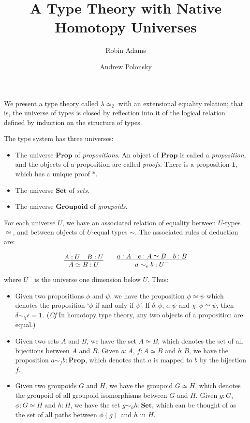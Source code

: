 \documentclass{easychair}
\title{A Type Theory with Native Homotopy Universes}
\author{Robin Adams\inst{1} \and Andrew Polonsky\inst{2}}
\institute{Universitetet i Bergen \and University Paris Diderot}
\newcommand{\Prop}{\ensuremath{\mathbf{Prop}}}
\newcommand{\Set}{\ensuremath{\mathbf{Set}}}
\newcommand{\Groupoid}{\ensuremath{\mathbf{Groupoid}}}
\newcommand{\LEtwo}{\ensuremath{\lambda \! \simeq_2}}
\begin{document}
\maketitle

We present a type theory called $\LEtwo$ with an extensional equality relation; that is, the universe of types is closed by reflection into it of the logical relation defined by induction on the structure of types.

The type system has three universes:
\begin{itemize}
\item
The universe $\Prop$ of \emph{propositions}.  An object of $\Prop$ is
called a \emph{proposition}, and the objects of a proposition are
called \emph{proofs}.  There is a proposition $\mathbf{1}$, which has
a unique proof $*$.
\item
The universe $\Set$ of \emph{sets}.
\item
The universe $\Groupoid$ of \emph{groupoids}.
\end{itemize}

For each universe $U$, we have an associated relation of equality
between $U$-types $\simeq$, and between objects of $U$-equal
types $\sim$.  The associated rules of deduction are:

\[ \infer{A \simeq B : U}{A : U \quad B : U}
\qquad
\infer{a \sim_e b : U^-}{a : A \quad e : A \simeq B \quad b : B} \]

where $U^-$ is the universe one dimension below $U$.  Thus:
\begin{itemize}
\item
Given two propositions $\phi$ and $\psi$, we have the proposition $\phi \simeq \psi$ which denotes the proposition `$\phi$ if and only if $\psi$'.  If $\delta : \phi$, $\epsilon : \psi$ and $\chi : \phi \simeq \psi$, then $\delta \sim_\chi \epsilon = \mathbf{1}$.  (\emph{Cf} In homotopy type theory, any two objects of a proposition are equal.)
\item
Given two sets $A$ and $B$, we have the set $A \simeq B$, which denotes the set of all bijections between $A$ and $B$.  Given $a : A$, $f : A \simeq B$ and $b : B$, we have the proposition $a \sim_f b : \Prop$, which denotes that $a$ is mapped to $b$ by the bijection $f$.
\item
Given two groupoids $G$ and $H$, we have the groupoid $G \simeq H$, which denotes the groupoid of all groupoid isomorphisms between $G$ and $H$.  Given $g : G$, $\phi : G \simeq H$ and $h : H$, we have the set $g \sim_\phi h : \Set$, which can be thought of as the set of all paths between $\phi(g)$ and $h$ in $H$.
\end{itemize}
\end{document}
